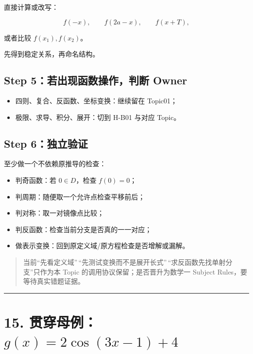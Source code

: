 \documentclass[11pt,a4paper]{ctexart}
\providecommand{\tightlist}{}
\begin{document}
直接计算或改写：

\[
f(-x),\qquad f(2a-x),\qquad f(x+T),
\]

或者比较 \(f(x_1),f(x_2)\)。

先得到稳定关系，再命名结构。

\subsection{Step 5：若出现函数操作，判断
Owner}\label{step-5ux82e5ux51faux73b0ux51fdux6570ux64cdux4f5cux5224ux65ad-owner}

\begin{itemize}
\tightlist
\item
  四则、复合、反函数、坐标变换：继续留在 Topic01；
\item
  极限、求导、积分、展开：切到 H-B01 与对应 Topic。
\end{itemize}

\subsection{Step 6：独立验证}\label{step-6ux72ecux7acbux9a8cux8bc1}

至少做一个不依赖原推导的检查：

\begin{itemize}
\tightlist
\item
  判奇函数：若 \(0\in D\)，检查 \(f(0)=0\)；
\item
  判周期：随便取一个允许点检查平移前后；
\item
  判对称：取一对镜像点比较；
\item
  判反函数：检查当前分支是否真的一一对应；
\item
  做表示变换：回到原定义域/原方程检查是否增解或漏解。
\end{itemize}

\begin{quote}
当前``先看定义域''\,``先测试变换而不是展开长式''\,``求反函数先找单射分支''只作为本
Topic 的调用协议保留；是否晋升为数学一 Subject
Rules，要等待真实错题证据。
\end{quote}

\begin{center}\rule{0.5\linewidth}{0.5pt}\end{center}

\section{\texorpdfstring{15.
贯穿母例：\(g(x)=2\cos(3x-1)+4\)}{15. 贯穿母例：g(x)=2\textbackslash cos(3x-1)+4}}\label{ux8d2fux7a7fux6bcdux4f8bgx2cos3x-14}
\end{document}
